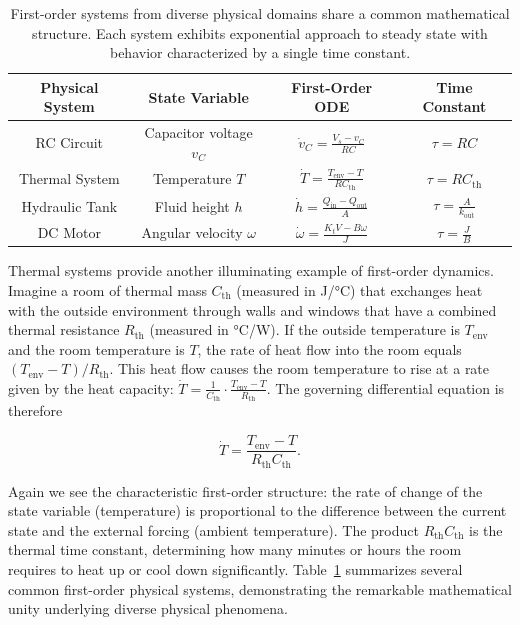 \begin{table}[h]
\centering
\begin{tabular}{|c|c|c|c|}
\hline
\textbf{Physical System} & \textbf{State Variable} & \textbf{First-Order ODE} & \textbf{Time Constant} \\
\hline
RC Circuit & Capacitor voltage $v_C$ & $\dot{v}_C = \frac{V_s - v_C}{RC}$ & $\tau = RC$ \\
\hline
Thermal System & Temperature $T$ & $\dot{T} = \frac{T_{\text{env}} - T}{RC_{\text{th}}}$ & $\tau = R C_{\text{th}}$ \\
\hline
Hydraulic Tank & Fluid height $h$ & $\dot{h} = \frac{Q_{\text{in}} - Q_{\text{out}}}{A}$ & $\tau = \frac{A}{k_{\text{out}}}$ \\
\hline
DC Motor & Angular velocity $\omega$ & $\dot{\omega} = \frac{K_t V - B\omega}{J}$ & $\tau = \frac{J}{B}$ \\
\hline
\end{tabular}
\vspace{0.5cm}
\caption{First-order systems from diverse physical domains share a common mathematical structure. Each system exhibits exponential approach to steady state with behavior characterized by a single time constant.}
\label{tab:first_order_systems}
\end{table}

Thermal systems provide another illuminating example of first-order dynamics. Imagine a room of thermal mass $C_{\text{th}}$ (measured in J/°C) that exchanges heat with the outside environment through walls and windows that have a combined thermal resistance $R_{\text{th}}$ (measured in °C/W). If the outside temperature is $T_{\text{env}}$ and the room temperature is $T$, the rate of heat flow into the room equals $(T_{\text{env}} - T)/R_{\text{th}}$. This heat flow causes the room temperature to rise at a rate given by the heat capacity: $\dot{T} = \frac{1}{C_{\text{th}}} \cdot \frac{T_{\text{env}} - T}{R_{\text{th}}}$. The governing differential equation is therefore

\begin{equation}
\dot{T} = \frac{T_{\text{env}} - T}{R_{\text{th}} C_{\text{th}}}.
\end{equation}

Again we see the characteristic first-order structure: the rate of change of the state variable (temperature) is proportional to the difference between the current state and the external forcing (ambient temperature). The product $R_{\text{th}} C_{\text{th}}$ is the thermal time constant, determining how many minutes or hours the room requires to heat up or cool down significantly. Table~\ref{tab:first_order_systems} summarizes several common first-order physical systems, demonstrating the remarkable mathematical unity underlying diverse physical phenomena.

